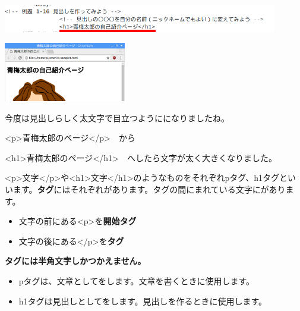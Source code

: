 \documentclass[a4paper,12pt]{jarticle}
\begin{document}
\bigskip

\includegraphics[width=0.9\textwidth]{textbook-img157.png}


\bigskip


\bigskip

\includegraphics[width=0.4\textwidth]{textbook-img156.png}


今度は見出しらしく太文字で目立つようにになりましたね。




\bigskip

{\textless}p{\textgreater}青梅太郎のページ{\textless}/p{\textgreater}　から

{\textless}h1{\textgreater}青梅太郎のページ{\textless}/h1{\textgreater}　へしたら文字が太く大きくなりました。


\bigskip

{\textless}p{\textgreater}文字{\textless}/p{\textgreater}や{\textless}h1{\textgreater}文字{\textless}/h1{\textgreater}のようなものをそれぞれpタグ、h1タグといいます。\textbf{タグ}にはそれぞれがあります。タグの間にまれている文字にがあります。

\begin{itemize}
  \item 文字の前にある{\textless}p{\textgreater}を\textbf{開始タグ}
  \item 文字の後にある{\textless}/p{\textgreater}を\textbf{タグ}
\end{itemize}

\textbf{タグには半角文字しかつかえません。}

\begin{itemize}
  \item pタグは、文章としてをします。文章を書くときに使用します。

  \item h1タグは見出しとしてをします。見出しを作るときに使用します。
\end{itemize}
\end{document}
